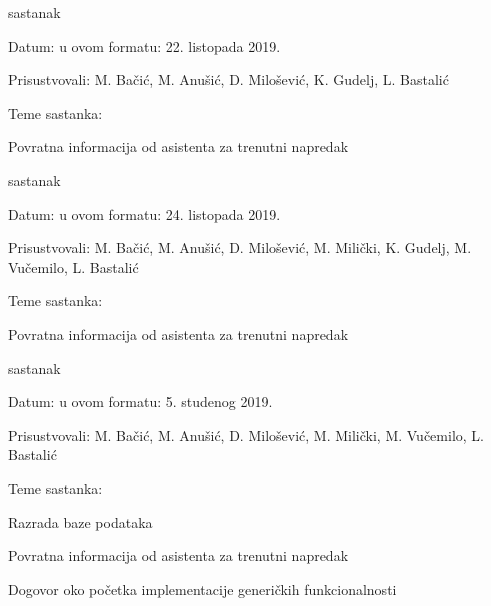 \begin{packed_enum}
			\item  sastanak
			\item[] \begin{packed_item}
				\item Datum: u ovom formatu: 22. listopada 2019.
				\item Prisustvovali: M. Bačić, M. Anušić, D. Milošević, K. Gudelj, L. Bastalić
				\item Teme sastanka:
				\begin{packed_item}
					\item  Povratna informacija od asistenta za trenutni napredak
				\end{packed_item}
			\end{packed_item}
		
			\item  sastanak
			\item[] \begin{packed_item}
				\item Datum: u ovom formatu: 24. listopada 2019.
				\item Prisustvovali:  M. Bačić, M. Anušić, D. Milošević, M. Milički, K. Gudelj, M. Vučemilo, L. Bastalić
				\item Teme sastanka:
				\begin{packed_item}
					\item  Povratna informacija od asistenta za trenutni napredak
				\end{packed_item}
			\end{packed_item}
		
			\item  sastanak
			\item[] \begin{packed_item}
				\item Datum: u ovom formatu: 5. studenog 2019.
				\item Prisustvovali:  M. Bačić, M. Anušić, D. Milošević, M. Milički, M. Vučemilo, L. Bastalić
				\item Teme sastanka:
				\begin{packed_item}
					\item  Razrada baze podataka
					\item  Povratna informacija od asistenta za trenutni napredak
					\item  Dogovor oko početka implementacije generičkih funkcionalnosti
				\end{packed_item}
			\end{packed_item}
			
			
		\end{packed_enum}
		
